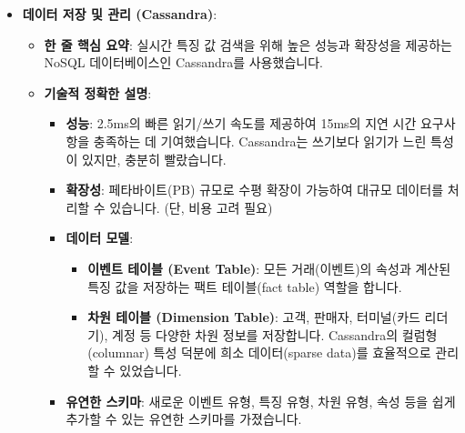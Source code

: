 \documentclass[11pt,a4paper]{article}
\begin{document}
\begin{itemize}
\begin{itemize}
\begin{itemize}
\begin{itemize}
\begin{itemize}
    \item \textbf{데이터 저장 및 관리 (Cassandra)}:
    \begin{itemize}
        \item \textbf{한 줄 핵심 요약}: 실시간 특징 값 검색을 위해 높은 성능과 확장성을 제공하는 NoSQL 데이터베이스인 Cassandra를 사용했습니다.
        \item \textbf{기술적 정확한 설명}:
        \begin{itemize}
            \item \textbf{성능}: 2.5ms의 빠른 읽기/쓰기 속도를 제공하여 15ms의 지연 시간 요구사항을 충족하는 데 기여했습니다. Cassandra는 쓰기보다 읽기가 느린 특성이 있지만, 충분히 빨랐습니다.
            \item \textbf{확장성}: 페타바이트(PB) 규모로 수평 확장이 가능하여 대규모 데이터를 처리할 수 있습니다. (단, 비용 고려 필요)
            \item \textbf{데이터 모델}:
            \begin{itemize}
                \item \textbf{이벤트 테이블 (Event Table)}: 모든 거래(이벤트)의 속성과 계산된 특징 값을 저장하는 팩트 테이블(fact table) 역할을 합니다.
                \item \textbf{차원 테이블 (Dimension Table)}: 고객, 판매자, 터미널(카드 리더기), 계정 등 다양한 차원 정보를 저장합니다. Cassandra의 컬럼형(columnar) 특성 덕분에 희소 데이터(sparse data)를 효율적으로 관리할 수 있었습니다.
            \end{itemize}
            \item \textbf{유연한 스키마}: 새로운 이벤트 유형, 특징 유형, 차원 유형, 속성 등을 쉽게 추가할 수 있는 유연한 스키마를 가졌습니다.
        \end{itemize}
    \end{itemize}


\end{itemize}
\end{itemize}
\end{itemize}
\end{itemize}
\end{itemize}
\end{document}
